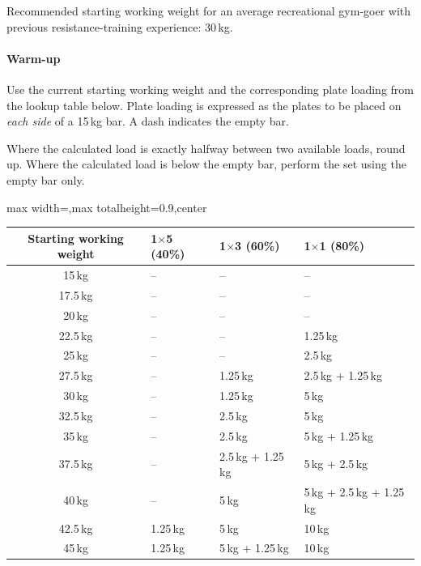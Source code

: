 \documentclass[11pt,a4paper]{article}
\newcommand{\tablearraystretch}{1.15}
\begin{document}
Recommended starting working weight for an average recreational gym-goer with previous resistance-training experience: 30\,kg.

\paragraph{Warm-up}

Use the current starting working weight and the corresponding plate loading from the lookup table below. Plate loading is expressed as the plates to be placed on \emph{each side} of a 15\,kg bar. A dash indicates the empty bar.

Where the calculated load is exactly halfway between two available loads, round up. Where the calculated load is below the empty bar, perform the set using the empty bar only.

\begin{center}
\renewcommand{\arraystretch}{\tablearraystretch}
\begin{adjustbox}{max width=\linewidth,max totalheight=0.9\textheight,center}
\begin{tabular}{c p{4cm} p{4cm} p{4cm}}
\toprule
Starting working weight &
1$\times$5 (40\%) &
1$\times$3 (60\%) &
1$\times$1 (80\%) \\
\midrule
15\,kg   & -- & -- & -- \\
17.5\,kg & -- & -- & -- \\
20\,kg   & -- & -- & -- \\
22.5\,kg & -- & -- & 1.25\,kg \\
25\,kg   & -- & -- & 2.5\,kg \\
27.5\,kg & -- & 1.25\,kg & 2.5\,kg + 1.25\,kg \\
30\,kg   & -- & 1.25\,kg & 5\,kg \\
32.5\,kg & -- & 2.5\,kg & 5\,kg \\
35\,kg   & -- & 2.5\,kg & 5\,kg + 1.25\,kg \\
37.5\,kg & -- & 2.5\,kg + 1.25\,kg & 5\,kg + 2.5\,kg \\
40\,kg   & -- & 5\,kg & 5\,kg + 2.5\,kg + 1.25\,kg \\
42.5\,kg & 1.25\,kg & 5\,kg & 10\,kg \\
45\,kg   & 1.25\,kg & 5\,kg + 1.25\,kg & 10\,kg \\
\bottomrule
\end{tabular}
\end{adjustbox}
\renewcommand{\arraystretch}{1}
\end{center}
\end{document}
